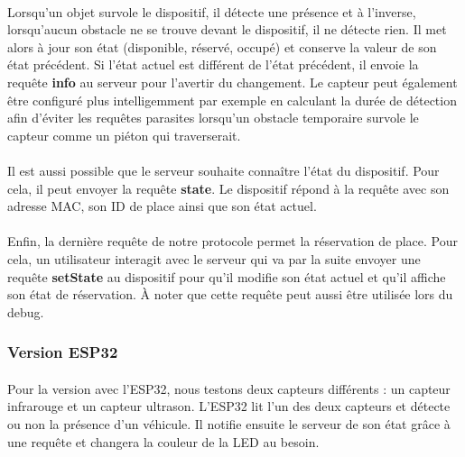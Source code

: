 \paragraph*{}
Lorsqu'un objet survole le dispositif, il détecte une présence et à l'inverse, lorsqu'aucun obstacle ne se trouve devant le dispositif, il ne détecte rien. Il met alors à jour son état (disponible, réservé, occupé) et conserve la valeur de son état précédent. Si l'état actuel est différent de l'état précédent, il envoie la requête \textbf{info} au serveur pour l'avertir du changement. Le capteur peut également être configuré plus intelligemment par exemple en calculant la durée de détection afin d'éviter les requêtes parasites lorsqu'un obstacle temporaire survole le capteur comme un piéton qui traverserait.


\paragraph*{}
Il est aussi possible que le serveur souhaite connaître l'état du dispositif. Pour cela, il peut envoyer la requête \textbf{state}. Le dispositif répond à la requête avec son adresse MAC, son ID de place ainsi que son état actuel.



\paragraph*{}
Enfin, la dernière requête de notre protocole permet la réservation de place. Pour cela, un utilisateur interagit avec le serveur qui va par la suite envoyer une requête \textbf{setState} au dispositif pour qu'il modifie son état actuel et qu'il affiche son état de réservation. À noter que cette requête peut aussi être utilisée lors du debug.




\clearpage
\subsubsection*{Version ESP32}

\paragraph*{}
Pour la version avec l'ESP32, nous testons deux capteurs différents : un capteur infrarouge et un capteur ultrason. L'ESP32 lit l'un des deux capteurs et détecte ou non la présence d'un véhicule. Il notifie ensuite le serveur de son état grâce à une requête et changera la couleur de la LED au besoin. 

